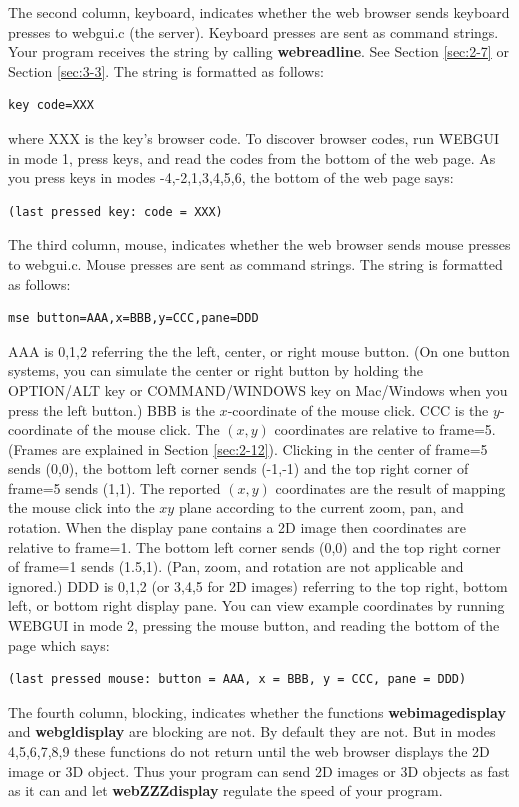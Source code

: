 The second column, keyboard, indicates whether the web browser sends keyboard presses to webgui.c (the server). 
Keyboard presses are sent as command strings. Your program receives the string by calling \textbf{webreadline}. See Section \ref{sec:2-7} 
or Section \ref{sec:3-3}. The string is formatted as follows:
\begin{verbatim}
key code=XXX
\end{verbatim}
where XXX is the key's browser code. To discover browser codes, run \f{WEBGUI} in mode 1, press keys, and read the 
codes from the bottom of the web page. As you press keys in modes -4,-2,1,3,4,5,6, the bottom of the web page says:
\begin{verbatim}
(last pressed key: code = XXX)
\end{verbatim}

The third column, mouse, indicates whether the web browser sends mouse presses to webgui.c. Mouse presses
are sent as command strings. The string is formatted as follows:
\begin{verbatim}
mse button=AAA,x=BBB,y=CCC,pane=DDD
\end{verbatim}
AAA is 0,1,2 referring the the left, center, or right mouse button. (On one button systems, you can simulate the center or right button
by holding the OPTION/ALT key or COMMAND/WINDOWS key on Mac/Windows when you press the left button.) 
BBB is the $x$-coordinate of the mouse click. CCC is the $y$-coordinate
of the mouse click. The $(x,y)$ coordinates are relative to frame=5. (Frames are explained in Section \ref{sec:2-12}).
Clicking in the center of frame=5 sends (0,0), the bottom left corner sends (-1,-1) 
and the top right corner of frame=5 sends (1,1). The reported $(x,y)$ coordinates are the result of mapping the mouse click 
into the $xy$ plane according to the current zoom, pan, and rotation. 
When the display pane contains a 2D image then coordinates are relative to frame=1. 
The bottom left corner sends (0,0) and the top right corner of frame=1 sends (1.5,1). (Pan, zoom, and rotation are not applicable and ignored.)
DDD is 0,1,2 (or 3,4,5 for 2D images) referring to the top right, bottom left, or bottom right display pane. You can view example coordinates 
by running \f{WEBGUI} in mode 2, pressing the mouse button, and reading the bottom of the page which says:
\begin{verbatim}
(last pressed mouse: button = AAA, x = BBB, y = CCC, pane = DDD)
\end{verbatim}

The fourth column, blocking, indicates whether the functions \textbf{webimagedisplay} and
\textbf{webgldisplay} are blocking are not. By default they are not. But in modes 4,5,6,7,8,9 these functions do not return until the web browser
displays the 2D image or 3D object. Thus your program can send 2D images or 3D objects as fast as it can and let \textbf{webZZZdisplay}
regulate the speed of your program.

